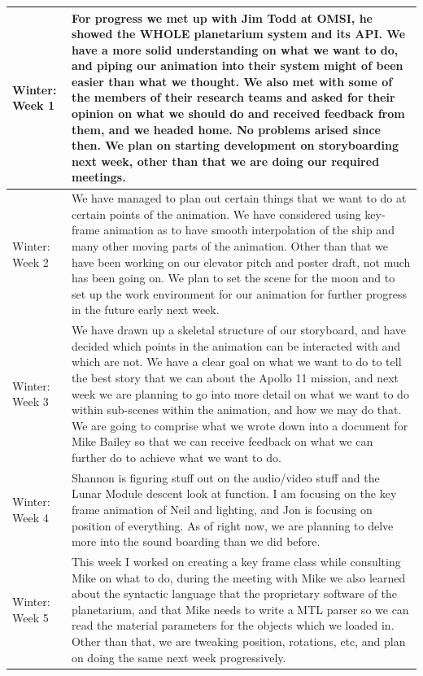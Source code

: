 \documentclass[onecolumn, draftclsnofoot,10pt, compsoc]{IEEEtran}
\begin{document}
\begin{longtable} {|p{1.5cm}|p{13.5cm}|}
Winter: Week 1 &
For progress we met up with Jim Todd at OMSI, he showed the WHOLE planetarium system and its API. We have a more solid understanding on what we want to do, and piping our animation into their system might of been easier than what we thought. We also met with some of the members of their research teams and asked for their opinion on what we should do and received feedback from them, and we headed home. No problems arised since then. We plan on starting development on storyboarding next week, other than that we are doing our required meetings.  \\ \hline

Winter: Week 2 &
We have managed to plan out certain things that we want to do at certain points of the animation. We have considered using key-frame animation as to have smooth interpolation of the ship and many other moving parts of the animation. Other than that we have been working on our elevator pitch and poster draft, not much has been going on. We plan to set the scene for the moon and to set up the work environment for our animation for further progress in the future early next week. \\ \hline

Winter: Week 3 &
We have drawn up a skeletal structure of our storyboard, and have decided which points in the animation can be interacted with and which are not. We have a clear goal on what we want to do to tell the best story that we can about the Apollo 11 mission, and next week we are planning to go into more detail on what we want to do within sub-scenes within the animation, and how we may do that. We are going to comprise what we wrote down into a document for Mike Bailey so that we can receive feedback on what we can further do to achieve what we want to do. \\ \hline

Winter: Week 4 &
Shannon is figuring stuff out on the audio/video stuff and the Lunar Module descent look at function. I am focusing on the key frame animation of Neil and lighting, and Jon is focusing on position of everything. As of right now, we are planning to delve more into the sound boarding than we did before. \\ \hline

Winter: Week 5 &
This week I worked on creating a key frame class while consulting Mike on what to do, during the meeting with Mike we also learned about the syntactic language that the proprietary software of the planetarium, and that Mike needs to write a MTL parser so we can read the material parameters for the objects which we loaded in. Other than that, we are tweaking position, rotations, etc, and plan on doing the same next week progressively. \\ \hline


\end{longtable}
\end{document}
